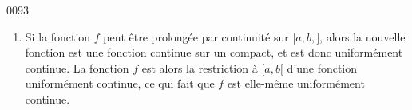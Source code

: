 
\begin{corrige}{0093}

\begin{enumerate}

\item
Si la fonction $f$ peut être prolongée par continuité sur $\mathopen[a,b,\mathclose]$, alors la nouvelle fonction est une fonction continue sur un compact, et est donc uniformément continue. La fonction $f$ est alors la restriction à $\mathopen[a,b[$ d'une fonction uniformément continue, ce qui fait que $f$ est elle-même uniformément continue.

\end{enumerate}


\end{corrige}

